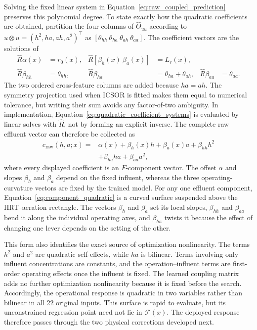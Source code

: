 \documentclass[a4paper,fleqn]{cas-sc}
\begin{document}
Solving the fixed linear system in Equation~\eqref{eq:raw_coupled_prediction} preserves this polynomial degree. To state exactly how the quadratic coefficients are obtained, partition the four columns of $\widehat\Theta_{uu}$ according to $u\otimes u=(h^2,ha,ah,a^2)^\top$ as $[\theta_{hh}\ \theta_{ha}\ \theta_{ah}\ \theta_{aa}]$. The coefficient vectors are the solutions of
\begin{equation}
\label{eq:quadratic_coefficient_systems}
\begin{aligned}
\widehat R\alpha(x)&=r_0(x),
&\widehat R[\beta_h(x)\ \beta_a(x)]&=L_r(x),\\
\widehat R\beta_{hh}&=\theta_{hh},
&\widehat R\beta_{ha}&=\theta_{ha}+\theta_{ah},
&\widehat R\beta_{aa}&=\theta_{aa}.
\end{aligned}
\end{equation}
The two ordered cross-feature columns are added because $ha=ah$. The symmetry projection used when ICSOR is fitted makes them equal to numerical tolerance, but writing their sum avoids any factor-of-two ambiguity. In implementation, Equation~\eqref{eq:quadratic_coefficient_systems} is evaluated by linear solves with $\widehat R$, not by forming an explicit inverse. The complete raw effluent vector can therefore be collected as
\begin{equation}
\label{eq:component_quadratic}
\begin{split}
c_{\mathrm{raw}}(h,a;x)={}&\alpha(x)
+\beta_h(x)h+\beta_a(x)a
+\beta_{hh}h^2\\
&+\beta_{ha}ha+\beta_{aa}a^2,
\end{split}
\end{equation}
where every displayed coefficient is an $F$-component vector. The offset $\alpha$ and slopes $\beta_h$ and $\beta_a$ depend on the fixed influent, whereas the three operating-curvature vectors are fixed by the trained model. For any one effluent component, Equation~\eqref{eq:component_quadratic} is a curved surface suspended above the HRT--aeration rectangle. The vectors $\beta_h$ and $\beta_a$ set its local slopes, $\beta_{hh}$ and $\beta_{aa}$ bend it along the individual operating axes, and $\beta_{ha}$ twists it because the effect of changing one lever depends on the setting of the other.

This form also identifies the exact source of optimization nonlinearity. The terms $h^2$ and $a^2$ are quadratic self-effects, while $ha$ is bilinear. Terms involving only influent concentrations are constants, and the operation--influent terms are first-order operating effects once the influent is fixed. The learned coupling matrix adds no further optimization nonlinearity because it is fixed before the search. Accordingly, the operational response is quadratic in two variables rather than bilinear in all 22 original inputs. This surface is rapid to evaluate, but its unconstrained regression point need not lie in $\mathcal F(x)$. The deployed response therefore passes through the two physical corrections developed next.
\end{document}

